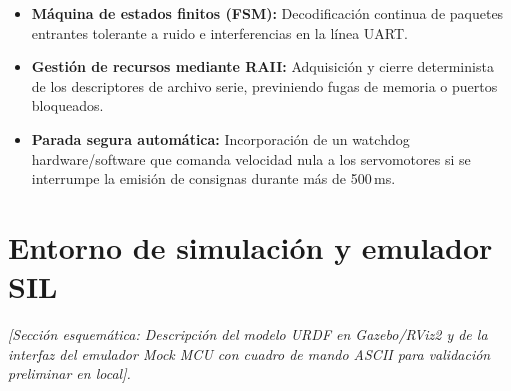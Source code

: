 \begin{itemize}
    \item \textbf{Máquina de estados finitos (FSM):} Decodificación continua de paquetes entrantes tolerante a ruido e interferencias en la línea UART.
    \item \textbf{Gestión de recursos mediante RAII:} Adquisición y cierre determinista de los descriptores de archivo serie, previniendo fugas de memoria o puertos bloqueados.
    \item \textbf{Parada segura automática:} Incorporación de un watchdog hardware/software que comanda velocidad nula a los servomotores si se interrumpe la emisión de consignas durante más de 500\,ms.
\end{itemize}

\section{Entorno de simulación y emulador SIL}
\label{sec:simulacion_mock}

\textit{[Sección esquemática: Descripción del modelo URDF en Gazebo/RViz2 y de la interfaz del emulador Mock MCU con cuadro de mando ASCII para validación preliminar en local].}

